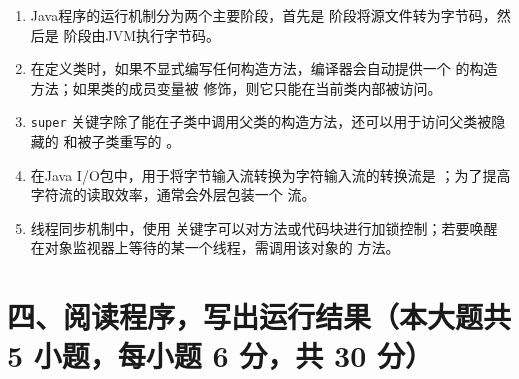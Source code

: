 \documentclass[a3paper, landscape, 11pt, twocolumn]{article}
\begin{document}
\begin{enumerate}[label=\arabic*., itemsep=1em]
	\item Java程序的运行机制分为两个主要阶段，首先是 \underline{\hspace{4cm}} 阶段将源文件转为字节码，然后是 \underline{\hspace{4cm}} 阶段由JVM执行字节码。

	\item 在定义类时，如果不显式编写任何构造方法，编译器会自动提供一个 \underline{\hspace{3cm}} 的构造方法；如果类的成员变量被 \underline{\hspace{3cm}} 修饰，则它只能在当前类内部被访问。

	\item \texttt{super} 关键字除了能在子类中调用父类的构造方法，还可以用于访问父类被隐藏的 \underline{\hspace{3.5cm}} 和被子类重写的 \underline{\hspace{3.5cm}}。

	\item 在Java I/O包中，用于将字节输入流转换为字符输入流的转换流是 \underline{\hspace{4cm}}；为了提高字符流的读取效率，通常会外层包装一个 \underline{\hspace{4cm}} 流。

	\item 线程同步机制中，使用 \underline{\hspace{4cm}} 关键字可以对方法或代码块进行加锁控制；若要唤醒在对象监视器上等待的某一个线程，需调用该对象的 \underline{\hspace{4cm}} 方法。
\end{enumerate}

\section*{四、阅读程序，写出运行结果（本大题共 5 小题，每小题 6 分，共 30 分）}
\end{document}
